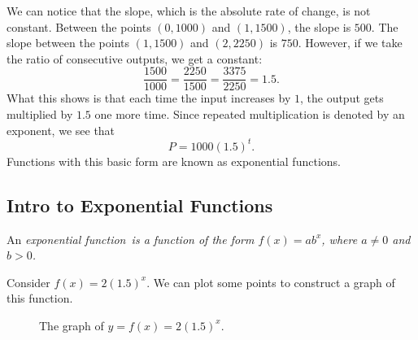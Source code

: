 \begin{eg}
We can notice that the slope, which is the absolute rate of change, is not constant. Between the points $(0,1000)$ and $(1,1500)$, the slope is $500$. The slope between the points $(1,1500)$ and $(2,2250)$ is $750$. However, if we take the ratio of consecutive outputs, we get a constant:
\[
\frac{1500}{1000} = \frac{2250}{1500} = \frac{3375}{2250}  = 1.5.
\]
What this shows is that each time the input increases by $1$, the output gets multiplied by $1.5$ one more time. Since repeated multiplication is denoted by an exponent, we see that
\[
P = 1000(1.5)^t.
\]
Functions with this basic form are known as exponential functions.


\subsection{Intro to Exponential Functions}

An \it{exponential function}\ \normalfont is a function of the form $f(x) = ab^x$, where $a\neq 0$ and $b>0$. 

\par

\begin{eg} Consider $f(x) = 2(1.5)^x$. We can plot some points to construct a graph of this function.

\begin{figure}[h]
\centering
{} 
\caption{The graph of $y=f(x) = 2(1.5)^x$.}
\end{figure}



\end{eg}
\end{eg}
